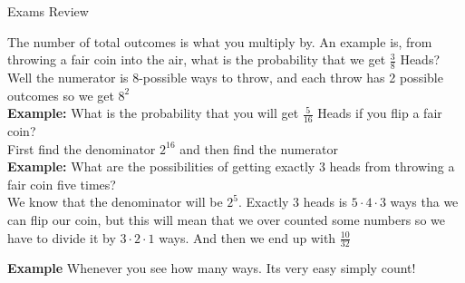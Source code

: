 \documentclass[12pt]{article}
\begin{document}
\begin{center}
  Exams Review 
\end{center}

\medskip

The number of total outcomes is what you multiply by. An example is, from throwing a fair
coin into the air, what is the probability that we get $\frac{3}{8}$ Heads? Well the 
numerator is 8-possible ways to throw, and each throw has 2 possible outcomes so we get
$8^2$ \\

\medskip
\textbf{Example: } What is the probability that you will get $\frac{5}{16}$ Heads if you
flip a fair coin?\\
First find the denominator $2^{16}$ and then find the numerator \\

\medskip
\textbf{Example: } What are the possibilities of getting exactly 3 heads from throwing a fair
coin five times? \\
We know that the denominator will be $2^5$. Exactly 3 heads is $5 \cdot 4 \cdot 3$ ways tha
we can flip our coin, but this will mean that we over counted some numbers so we have to divide
it by $3 \cdot 2 \cdot 1$ ways. And then we end up with $\frac{10}{32}$

\textbf{Example } Whenever you see how many ways. Its very easy simply count!
\end{document}
